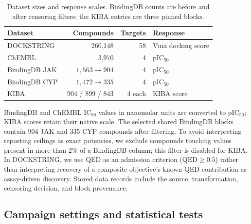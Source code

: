 \documentclass[10pt]{article}
\begin{document}
\begin{table}[htbp]
\centering\small
\begin{tabular}{lrrl}
\toprule
Dataset & Compounds & Targets & Response \\
\midrule
DOCKSTRING~\cite{dockstring2022} & 260{,}148 & 58 & Vina docking score \\
ChEMBL~\cite{chembl2019} & 3{,}970 & 4 & pIC$_{50}$ \\
BindingDB JAK~\cite{bindingdb2016} & $1{,}563\to904$ & 4 & pIC$_{50}$ \\
BindingDB CYP & $1{,}472\to335$ & 4 & pIC$_{50}$ \\
KIBA~\cite{tang2014kiba} & 904 / 899 / 843 & 4 each & KIBA score \\
\bottomrule
\end{tabular}
\caption{Dataset sizes and response scales. BindingDB counts are before and
after censoring filters; the KIBA entries are three pinned blocks.}
\label{tab:data}
\end{table}

BindingDB and ChEMBL IC$_{50}$ values in nanomolar units are converted to
pIC$_{50}$; KIBA scores retain their native scale. The selected shared
BindingDB blocks contain 904 JAK and 335 CYP compounds after filtering. To
avoid interpreting reporting ceilings as exact potencies, we exclude
compounds touching values present in more than $2\%$ of a BindingDB column;
this filter is disabled for KIBA. In DOCKSTRING, we use QED as an admission
criterion ($\mathrm{QED}\ge0.5$) rather than interpreting recovery of a
composite objective's known QED contribution as assay-driven discovery.
Stored data records include the source, transformation, censoring decision,
and block provenance.

\subsection{Campaign settings and statistical tests}
\label{app:statistics}
\end{document}

